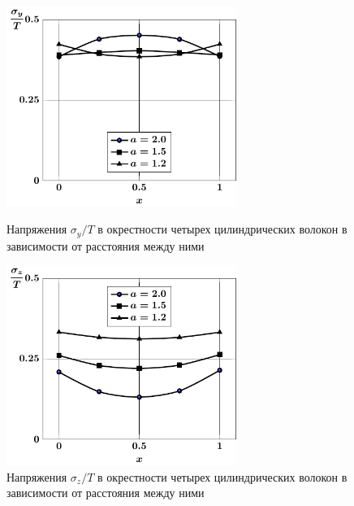 \begin{figure}[h!]
\centering\footnotesize
\parbox[b]{7.5cm}{\centering\includegraphics[width=7.5cm]{inclusion-4-y-a.pdf}
\caption{Напряжения $\sigma_y/T$ в окрестности четырех цилиндрических волокон в зависимости от расстояния между ними
\label{f:7:56}}}\hfil\hfil
\parbox[b]{7.5cm}{\centering\includegraphics[width=7.5cm]{inclusion-4-z-a.pdf}
\caption{Напряжения $\sigma_z/T$ в окрестности четырех цилиндрических волокон в зависимости от расстояния между ними
\label{f:7:57}}}
\end{figure}

%

